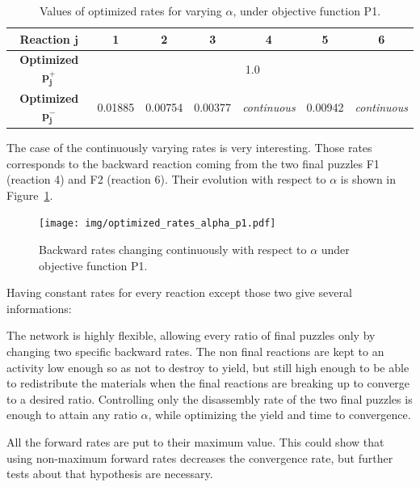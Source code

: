     \begin{table}
        \begin{center}
        \begin{tabular}{|c|c|c|c|c|c|c|}
            \hline
            \textbf{Reaction} $\mathbf{j}$ & \textbf{1} & \textbf{2} & \textbf{3} & \textbf{4} & \textbf{5} & \textbf{6} \\
            \hline
            \textbf{Optimized} $\mathbf{p^+_j}$ & \multicolumn{6}{c|}{1.0} \\
            \hline
            \textbf{Optimized} $\mathbf{p^-_j}$ & 0.01885 & 0.00754 & 0.00377 & \textit{continuous} & 0.00942 & \textit{continuous} \\
            \hline
        \end{tabular}
        \end{center}
        \caption{Values of optimized rates for varying $\alpha$, under objective function P1.}
        \label{tab:optimized_rates_p1}
    \end{table}

    The case of the continuously varying rates is very interesting. Those rates corresponds to the backward reaction coming from the two final puzzles F1 (reaction 4) and F2 (reaction 6). Their evolution with respect to $\alpha$ is shown in Figure~\ref{fig:img_optimized_rates_alpha_p1}.

    \begin{figure}[h]
        \centering
            \texttt{[image: img/optimized\_rates\_alpha\_p1.pdf]}
        \caption{Backward rates changing continuously with respect to $\alpha$ under objective function P1.}
        \label{fig:img_optimized_rates_alpha_p1}
    \end{figure}

    Having constant rates for every reaction except those two give several informations:

    \begin{my_itemize}
        \item The network is highly flexible, allowing every ratio of final puzzles only by changing two specific backward rates. The non final reactions are kept to an activity low enough so as not to destroy to yield, but still high enough to be able to redistribute the materials when the final reactions are breaking up to converge to a desired ratio. Controlling only the disassembly rate of the two final puzzles is enough to attain any ratio $\alpha$, while optimizing the yield and time to convergence.
        \item All the forward rates are put to their maximum value. This could show that using non-maximum forward rates decreases the convergence rate, but further tests about that hypothesis are necessary.
    \end{my_itemize}

